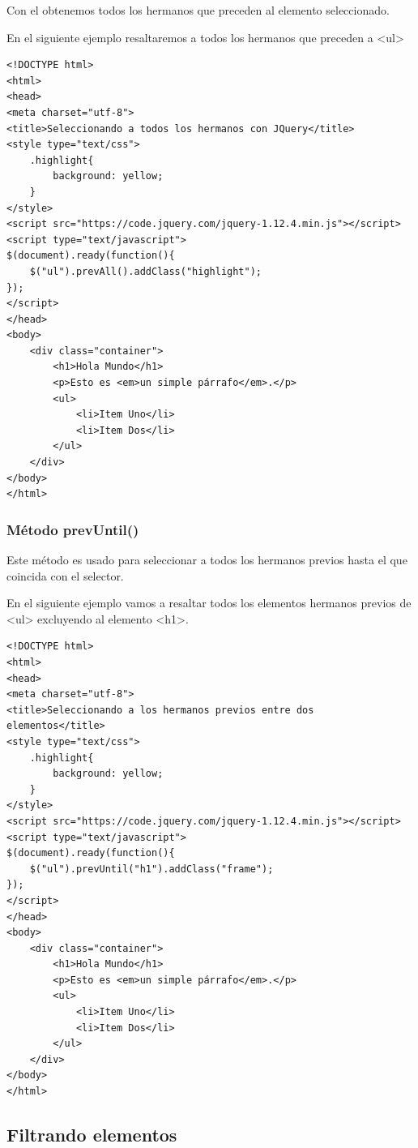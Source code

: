 \documentclass[a4paper, oneside]{article}
\begin{document}
Con el obtenemos todos los hermanos que preceden al elemento seleccionado. 

En el siguiente ejemplo resaltaremos a todos los hermanos que preceden a <ul>

\begin{verbatim}
<!DOCTYPE html>
<html>
<head>
<meta charset="utf-8">
<title>Seleccionando a todos los hermanos con JQuery</title>
<style type="text/css">
    .highlight{
        background: yellow;
    }        
</style>
<script src="https://code.jquery.com/jquery-1.12.4.min.js"></script>
<script type="text/javascript">
$(document).ready(function(){
    $("ul").prevAll().addClass("highlight");
});
</script>
</head>
<body>
    <div class="container">
        <h1>Hola Mundo</h1>
        <p>Esto es <em>un simple párrafo</em>.</p>
        <ul>
            <li>Item Uno</li>
            <li>Item Dos</li>
        </ul>
    </div>
</body>
</html>                                		
\end{verbatim}

\subsubsection{Método prevUntil()}
\label{sec:orgf5187d4}

Este método es usado para seleccionar a todos los hermanos previos hasta el que coincida con el selector. 

En el siguiente ejemplo vamos a resaltar todos los elementos hermanos previos de <ul> excluyendo al elemento <h1>. 

\begin{verbatim}
<!DOCTYPE html>
<html>
<head>
<meta charset="utf-8">
<title>Seleccionando a los hermanos previos entre dos elementos</title>
<style type="text/css">
    .highlight{
        background: yellow;
    }        
</style>
<script src="https://code.jquery.com/jquery-1.12.4.min.js"></script>
<script type="text/javascript">
$(document).ready(function(){
    $("ul").prevUntil("h1").addClass("frame");
});
</script>
</head>
<body>
    <div class="container">
        <h1>Hola Mundo</h1>
        <p>Esto es <em>un simple párrafo</em>.</p>
        <ul>
            <li>Item Uno</li>
            <li>Item Dos</li>
        </ul>
    </div>
</body>
</html>                                		
\end{verbatim}

\subsection{Filtrando elementos}
\label{sec:org0908862}
\end{document}
